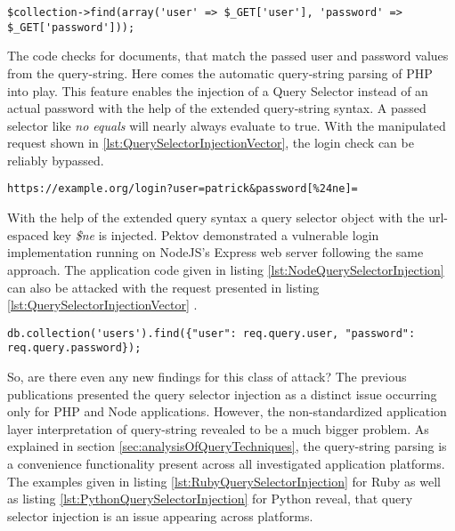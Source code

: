 \begin{lstlisting}[caption={Vulnerable PHP example for query selector injection against MongoDB}, label={lst:PHPQuerySelectorInjection}]
$collection->find(array('user' => $_GET['user'], 'password' => $_GET['password']));
\end{lstlisting}

The code checks for documents, that match the passed user and password values from the query-string. Here comes the automatic query-string parsing of PHP into play. This feature enables the injection of a Query Selector instead of an actual password with the help of the extended query-string syntax. A passed selector like \emph{no equals} will nearly always evaluate to true. With the manipulated request shown in \ref{lst:QuerySelectorInjectionVector}, the login check can be reliably bypassed. \\

\begin{lstlisting}[caption={Attack vector against MongoDB for query selector injection via the query-string parameter}, label={lst:QuerySelectorInjectionVector}]
https://example.org/login?user=patrick&password[%24ne]=
\end{lstlisting}

With the help of the extended query syntax a query selector object with the url-espaced key \emph{\$ne} is injected. Pektov \cite{Petkov:2014a} demonstrated a vulnerable login implementation running on NodeJS's Express web server following the same approach. The application code given in listing \ref{lst:NodeQuerySelectorInjection} can also be attacked with the request presented in listing \ref{lst:QuerySelectorInjectionVector} . \\

\begin{lstlisting}[caption={Vulnerable NodeJS example for query selector injection against MongoDB}, label={lst:NodeQuerySelectorInjection}]
db.collection('users').find({"user": req.query.user, "password": req.query.password});
\end{lstlisting}

So, are there even any new findings for this class of attack? The previous publications presented the query selector injection as a distinct issue occurring only for PHP and Node applications. However, the non-standardized application layer interpretation of query-string revealed to be a much bigger problem. As explained in section \ref{sec:analysisOfQueryTechniques}, the query-string parsing is a convenience functionality present across all investigated application platforms. The examples given in listing \ref{lst:RubyQuerySelectorInjection} for Ruby as well as listing \ref{lst:PythonQuerySelectorInjection} for Python reveal, that query selector injection is an issue appearing across platforms. \\

